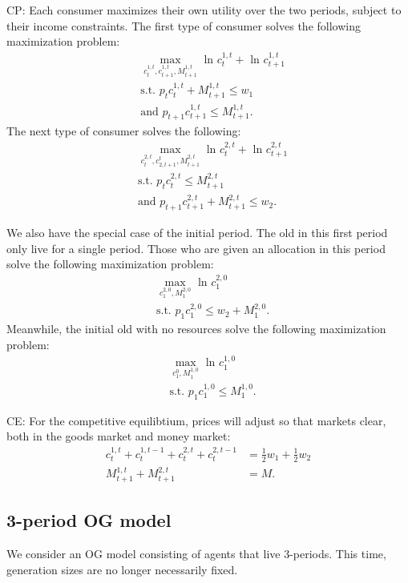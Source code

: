 \documentclass[11pt]{article} %
\begin{document}
CP: Each consumer maximizes their own utility over the two periods, subject to their income constraints.
The first type of consumer solves the following maximization problem:
\begin{align*}
&\max_{c_t^{1,t},c_{t+1}^{1,t},M_{t+1}^{1,t}} \text{ ln } c_{t}^{1,t} + \text{ ln } c_{t+1}^{1,t}\\
&\text{s.t. }  p_t c_{t}^{1,t} + M_{t+1}^{1,t} \leq w_1 \\
& \text{and } p_{t+1} c_{t+1}^{1,t} \leq M_{t+1}^{1,t}.
\end{align*}
The next type of consumer solves the following:
\begin{align*}
&\max_{c_t^{2,t},c_{2,t+1}^{t},M_{t+1}^{2,t}} \text{ ln } c_{t}^{2,t} + \text{ ln } c_{t+1}^{2,t}\\
&\text{s.t. }  p_t c_{t}^{2,t}  \leq M_{t+1}^{2,t} \\
& \text{and } p_{t+1} c_{t+1}^{2,t} + M_{t+1}^{2,t}\leq w_2.
\end{align*}

We also have the special case of the initial period. The old in this first period only live for a single period. Those who are given an allocation in this period solve the following maximization problem:
\begin{align*}
&\max_{c_{1}^{2,0},M_1^{2,0}} \text{ ln } c_{1}^{2,0} \\
&\text{s.t. }  p_1 c_{1}^{2,0} \leq w_2 + M_{1}^{2,0} .
\end{align*}
Meanwhile, the initial old with no resources solve the following maximization problem:
\begin{align*}
&\max_{c_{1}^{0},M_{1}^{1,0}} \text{ ln } c_{1}^{1,0} \\
&\text{s.t. }  p_1 c_{1}^{1,0} \leq M_{1}^{1,0} .
\end{align*}

CE: For the competitive equilibtium, prices will adjust so that markets clear, both in the goods market and money market:
\begin{align*}
c_{t}^{1,t} +  c_{t}^{1,t-1} + c_{t}^{2,t} +  c_{t}^{2,t-1} &= \frac{1}{2}w_1 + \frac{1}{2} w_2 \\
M_{t+1}^{1,t} + M_{t+1}^{2,t} &= M.
\end{align*}

\subsection{3-period OG model}
We consider an OG model consisting of agents that live 3-periods. This time, generation sizes are no longer necessarily fixed.
\end{document}
